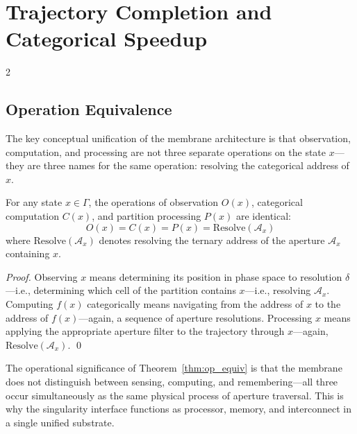 \section{Trajectory Completion and Categorical Speedup}
\label{sec:ch11_speedup}

\begin{multicols}{2}

\subsection{Operation Equivalence}

The key conceptual unification of the membrane architecture is that observation, computation, and processing are not three separate operations on the state $x$---they are three names for the same operation: resolving the categorical address of $x$.

\begin{theorem}
\label{thm:op_equiv}
For any state $x \in \Gamma$, the operations of observation $O(x)$, categorical computation $C(x)$, and partition processing $P(x)$ are identical:
\begin{equation}
O(x) = C(x) = P(x) = \mathrm{Resolve}(\mathcal{A}_x)
\label{eq:ch11_opequiv}
\end{equation}
where $\mathrm{Resolve}(\mathcal{A}_x)$ denotes resolving the ternary address of the aperture $\mathcal{A}_x$ containing $x$.
\end{theorem}

\begin{proof}
Observing $x$ means determining its position in phase space to resolution $\delta$---i.e., determining which cell of the partition contains $x$---i.e., resolving $\mathcal{A}_x$. Computing $f(x)$ categorically means navigating from the address of $x$ to the address of $f(x)$---again, a sequence of aperture resolutions. Processing $x$ means applying the appropriate aperture filter to the trajectory through $x$---again, $\mathrm{Resolve}(\mathcal{A}_x)$. \qed
\end{proof}

The operational significance of Theorem~\ref{thm:op_equiv} is that the membrane does not distinguish between sensing, computing, and remembering---all three occur simultaneously as the same physical process of aperture traversal. This is why the singularity interface functions as processor, memory, and interconnect in a single unified substrate.


\end{multicols}
